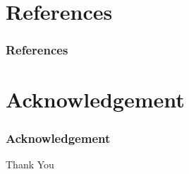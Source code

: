 \documentclass{beamer}
\begin{document}
\section{References}
\begin{frame}[allowframebreaks]
\frametitle{References}
 \nocite{*}
 

\end{frame}

\section{Acknowledgement}
\begin{frame} [allowframebreaks]
\frametitle{Acknowledgement}
\lipsum[1]


\end{frame}

\begin{frame}
\Huge{\centerline{Thank You}}
\end{frame}

\end{document}
